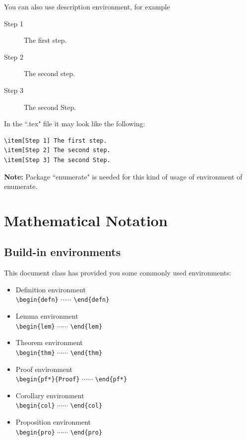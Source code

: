 \documentclass[print]{jicspack}
\begin{document}
You can also use description environment, for example
\begin{description}
\item[Step 1] The first step. \item[Step 2] The second step.
\item[Step 3] The second Step.
\end{description}
In the ``.tex" file it may look like the following:
\begin{verbatim}
\item[Step 1] The first step.
\item[Step 2] The second step.
\item[Step 3] The second Step.
\end{verbatim}
{\bf Note:} Package ``enumerate" is needed for this kind of usage
of environment of enumerate. \label{subsectiontitlerule}
\section{Mathematical Notation}
\subsection{Build-in environments}
This document class has provided you some commonly used environments:
\begin{itemize}
\item{Definition environment}\\
{\verb|\begin{defn}|
$\cdots\cdots$
\verb|\end{defn}|}
\item{Lemma environment}\\
{\verb|\begin{lem}|
$\cdots\cdots$
\verb|\end{lem}|}
\item{Theorem environment}\\
{\verb|\begin{thm}|
$\cdots\cdots$
\verb|\end{thm}|}
\item{Proof environment}\\
{\verb|\begin{pf*}{Proof}|
$\cdots\cdots$ \verb|\end{pf*}|}
\item{Corollary environment}\\
{\verb|\begin{col}|
$\cdots\cdots$
\verb|\end{col}|}
\item{Proposition environment}\\
{\verb|\begin{pro}|
$\cdots\cdots$
\verb|\end{pro}|}
\end{itemize}
\end{document}
